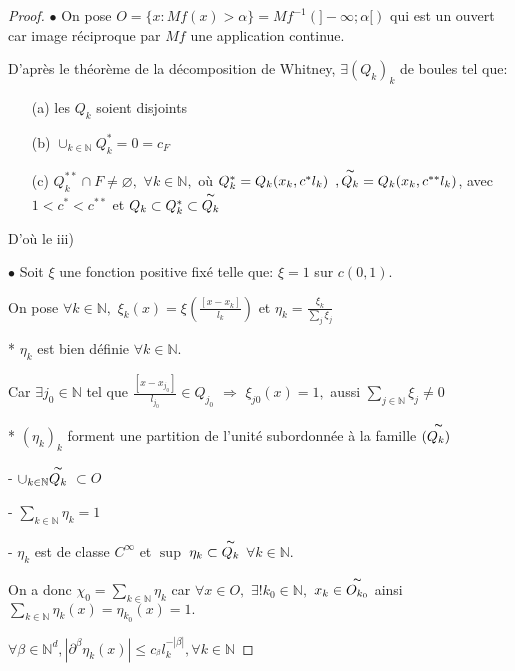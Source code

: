 \documentclass[12pt, a4paper, oneside]{article}
\begin{document}
\begin{proof} 
	$\bullet$ On pose $O=\{x:Mf(x)>\alpha \}=Mf^{-1}(]-\infty ;\alpha \lbrack )$ qui est
	un ouvert car image réciproque par $Mf$ une application continue.
	
	D'après le théorème de la décomposition de Whitney, $\exists
	(Q_{k})_{k}$ de boules tel que:
	\begin{enumerate}
		\item[(a)] les $Q_{k}$ soient disjoints
		\item[(b)] $\cup _{k\in \mathbb{N}}Q_{k}^{\ast }=0=c_{F}$
		\item[(c)] $Q_{k}^{\ast \ast }\cap F\neq \varnothing ,$ $\forall k\in \mathbb{N},$ où $Q_{k}^{\ast }=Q_{k}(x_{k},c^{\ast }l_{k})\,\ ,\overset{\thicksim }
		{Q_{k}}=Q_{k}(x_{k},c^{\ast \ast }l_{k})$, avec $1<c^{\ast }<c^{\ast \ast }$
		et $Q_{k}\subset Q_{k}^{\ast }\subset \overset{\thicksim }{Q_{k}}$
	\end{enumerate}
	
	D'où le iii)
	
	$\bullet$ Soit $\xi $  une fonction positive fixé telle que: $\xi =1$ sur $c(0,1).$
	
	On pose $\forall k\in \mathbb{N},$ $\xi _{k}(x)=\xi (\frac{[x-x_{k}]}{l_{k}})$ et $\eta _{k}=\frac{\xi _{k}}{
		\sum\limits_{j}\xi _{j}}$
	
	* $\eta _{k}$ est bien définie $\forall k\in \mathbb{N}.$
	
	Car $\exists j_{0}\in \mathbb{N}$ tel que $\frac{[x-x_{j_{0}}]}{l_{j_{0}}}\in Q_{j_{0}}$ $\Longrightarrow $ $
	\xi _{j0}(x)=1,$ aussi $\sum\limits_{j\in \mathbb{N}}\xi _{j}\neq 0$
	
	* $(\eta _{k})_{k}$ forment une partition de l'unité subordonnée à la famille $(\overset{\thicksim }{Q_{k})}$
	
	- $\cup _{k\in \mathbb{N}}\overset{\thicksim }{Q_{k}}$ $\subset O$
	
	- $\sum\limits_{k\in \mathbb{N}}\eta _{k}=1$
	
	- $\eta _{k}$ est de classe $C^{\infty }$ et $\sup$ $\eta _{k}\subset 
	\overset{\thicksim }{Q_{k}}$ $\forall k\in \mathbb{N}$.
	
	On a donc $\chi _{0}=\sum\limits_{k\in \mathbb{N}}\eta _{k}$ car $\forall x\in O,$ $\exists !k_{0}\in \mathbb{N},$ $x_{k}\in \overset{\thicksim }{O_{k_{0}}}$ ainsi $\sum\limits_{k\in \mathbb{N}}\eta _{k}(x)=\eta _{k_{0}}(x)=1.$
	
	$\forall \beta \in \mathbb{N}^{d},\left\vert \partial ^{\beta }\eta _{k}(x)\right\vert \leq c_{^{\beta
	}}l_{k}^{-\left\vert \beta \right\vert },\forall k\in \mathbb{N}$ 
	

\end{proof}
\end{document}
